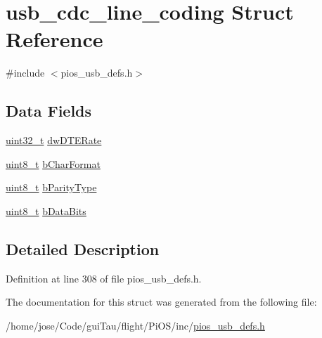 \hypertarget{structusb__cdc__line__coding}{\section{usb\-\_\-cdc\-\_\-line\-\_\-coding Struct Reference}
\label{structusb__cdc__line__coding}
}


{\ttfamily \#include $<$pios\-\_\-usb\-\_\-defs.\-h$>$}

\subsection*{Data Fields}
\begin{DoxyCompactItemize}
\item 
\hyperlink{stdint_8h_a435d1572bf3f880d55459d9805097f62}{uint32\-\_\-t} \hyperlink{group___p_i_o_s___u_s_b___d_e_f_s_gabba439cd113503e9223c9d61865319d2}{dw\-D\-T\-E\-Rate}
\item 
\hyperlink{stdint_8h_aba7bc1797add20fe3efdf37ced1182c5}{uint8\-\_\-t} \hyperlink{group___p_i_o_s___u_s_b___d_e_f_s_gaae309443995f9fe84f44a78bd866cc1a}{b\-Char\-Format}
\item 
\hyperlink{stdint_8h_aba7bc1797add20fe3efdf37ced1182c5}{uint8\-\_\-t} \hyperlink{group___p_i_o_s___u_s_b___d_e_f_s_gad1b91d6baa7411fa9f6341140f5ac216}{b\-Parity\-Type}
\item 
\hyperlink{stdint_8h_aba7bc1797add20fe3efdf37ced1182c5}{uint8\-\_\-t} \hyperlink{group___p_i_o_s___u_s_b___d_e_f_s_ga81e0e896a0524b8db945e1a8b50668e6}{b\-Data\-Bits}
\end{DoxyCompactItemize}


\subsection{Detailed Description}


Definition at line 308 of file pios\-\_\-usb\-\_\-defs.\-h.



The documentation for this struct was generated from the following file\-:\begin{DoxyCompactItemize}
\item 
/home/jose/\-Code/gui\-Tau/flight/\-Pi\-O\-S/inc/\hyperlink{pios__usb__defs_8h}{pios\-\_\-usb\-\_\-defs.\-h}\end{DoxyCompactItemize}
